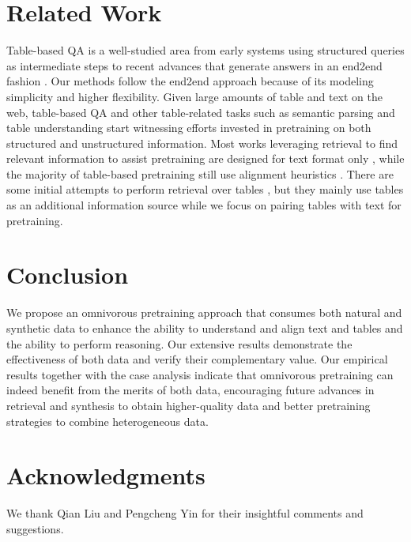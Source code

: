 \documentclass[11pt]{article}
\begin{document}
\section{Related Work}\label{sec:related}
Table-based QA is a well-studied area from early systems using structured queries as intermediate steps \cite{krishnamurthy-2017-typeparser,liang-2018-mapo,wang-2019-latent,tabert-2020-yin,yu-grappa-2021} to recent advances that generate answers in an end2end fashion \cite{tapas-2020-herzig,tapex-2021-liu}.
Our methods follow the end2end approach because of its modeling simplicity and higher flexibility.
Given large amounts of table and text on the web, table-based QA and other table-related tasks such as semantic parsing \cite{strug-2021-deng,shi-2021-gap} and table understanding \cite{turl-2020-deng,tuta-2021-wang} start witnessing efforts invested in pretraining on both structured and unstructured information.
Most works leveraging retrieval to find relevant information to assist pretraining are designed for text format only \cite{guu-2020-realm,lewis-2020-para}, while the majority of table-based pretraining still use alignment heuristics \cite{tapas-2020-herzig,tabert-2020-yin}.
There are some initial attempts to perform retrieval over tables \cite{ouz-2020-unik,herzig-2021-dtr,ma-2021-uni}, but they mainly use tables as an additional information source while we focus on pairing tables with text for pretraining.

\section{Conclusion}
We propose an omnivorous pretraining approach that consumes both natural and synthetic data to enhance the ability to understand and align text and tables and the ability to perform reasoning.
Our extensive results demonstrate the effectiveness of both data and verify their complementary value.
Our empirical results together with the case analysis indicate that omnivorous pretraining can indeed benefit from the merits of both data, encouraging future advances in retrieval and synthesis to obtain higher-quality data and better pretraining strategies to combine heterogeneous data.

\section*{Acknowledgments}
We thank Qian Liu and Pengcheng Yin for their insightful comments and suggestions.



\end{document}
